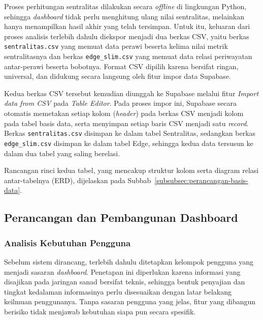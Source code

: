 \begin{sloppypar}
Proses perhitungan sentralitas dilakukan secara \textit{offline} di lingkungan Python, sehingga \textit{dashboard} tidak perlu menghitung ulang nilai sentralitas, melainkan hanya menampilkan hasil akhir yang telah tersimpan. Untuk itu, keluaran dari proses analisis terlebih dahulu diekspor menjadi dua berkas CSV, yaitu berkas \texttt{sentralitas.csv} yang memuat data perawi beserta kelima nilai metrik sentralitasnya dan berkas \texttt{edge\_slim.csv} yang memuat data relasi periwayatan antar-perawi beserta bobotnya. Format CSV dipilih karena bersifat ringan, universal, dan didukung secara langsung oleh fitur impor data Supabase.
\end{sloppypar}

\begin{sloppypar}
Kedua berkas CSV tersebut kemudian diunggah ke Supabase melalui fitur \textit{Import data from CSV} pada \textit{Table Editor}. Pada proses impor ini, Supabase secara otomatis memetakan setiap kolom (\textit{header}) pada berkas CSV menjadi kolom pada tabel basis data, serta menyimpan setiap baris CSV menjadi satu \textit{record}. Berkas \texttt{sentralitas.csv} disimpan ke dalam tabel Sentralitas, sedangkan berkas \texttt{edge\_slim.csv} disimpan ke dalam tabel Edge, sehingga kedua data tersusun ke dalam dua tabel yang saling berelasi.
\end{sloppypar}

Rancangan rinci kedua tabel, yang mencakup struktur kolom serta diagram relasi antar-tabelnya (ERD), dijelaskan pada Subbab~\ref{subsubsec:perancangan-basis-data}.


\subsection{Perancangan dan Pembangunan Dashboard}
\subsubsection{Analisis Kebutuhan Pengguna}
\label{subsubsec:kebutuhan-pengguna}
Sebelum sistem dirancang, terlebih dahulu ditetapkan kelompok pengguna yang menjadi sasaran \textit{dashboard}. Penetapan ini diperlukan karena informasi yang disajikan pada jaringan sanad bersifat teknis, sehingga bentuk penyajian dan tingkat kedalaman informasinya perlu disesuaikan dengan latar belakang keilmuan penggunanya. Tanpa sasaran pengguna yang jelas, fitur yang dibangun berisiko tidak menjawab kebutuhan siapa pun secara spesifik.

